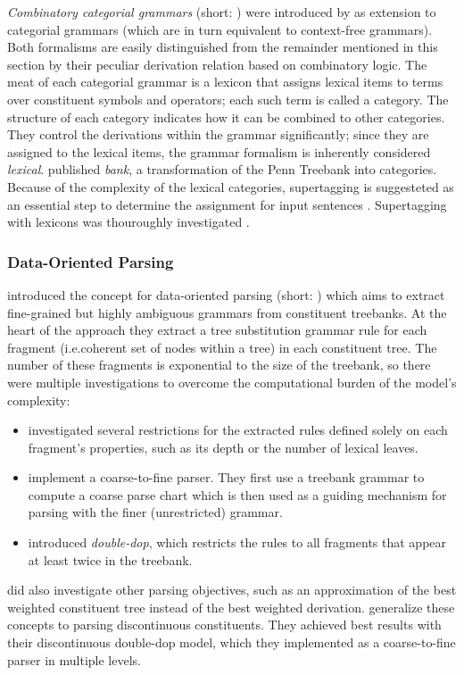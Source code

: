 \documentclass[../document.tex]{subfiles}
\begin{document}
    \emph{Combinatory categorial grammars} (short: ) were introduced by \citet{Ste11} as extension to categorial grammars (which are in turn equivalent to context-free grammars).
    Both formalisms are easily distinguished from the remainder mentioned in this section by their peculiar derivation relation based on combinatory logic.
    The meat of each categorial grammar is a lexicon that assigns lexical items to terms over constituent symbols and operators; each such term is called a category.
    The structure of each category indicates how it can be combined to other categories.
    They control the derivations within the grammar significantly; since they are assigned to the lexical items, the grammar formalism is inherently considered \emph{lexical}.
    \cite{Hoc07} published \emph{ bank}, a transformation of the Penn Treebank into  categories.
    Because of the complexity of the lexical categories, supertagging is suggesteted as an essential step to determine the assignment for input sentences \citep{Clark04}.
    Supertagging with  lexicons was thouroughly investigated \citep{clark2002supertagging, LewisSteedman14, vaswani2016supertagging, Kad18, StaSte20}.

    \subsubsection*{Data-Oriented Parsing}
    \citet{Bod92} introduced the concept for data-oriented parsing (short: ) which aims to extract fine-grained but highly ambiguous grammars from constituent treebanks.
    At the heart of the approach they extract a tree substitution grammar rule for each fragment (i.e.\@ coherent set of nodes within a tree) in each constituent tree.
    The number of these fragments is exponential to the size of the treebank, so there were multiple investigations to overcome the computational burden of the model's complexity:
    \begin{itemize}
        \item \citet{Bod01} investigated several restrictions for the extracted rules defined solely on each fragment's properties, such as its depth or the number of lexical leaves.
        \item \citet{Ban10} implement a coarse-to-fine parser. They first use a treebank grammar to compute a coarse parse chart which is then used as a guiding mechanism for parsing with the finer (unrestricted)  grammar.
        \item \citet{San11} introduced \emph{double-dop}, which restricts the rules to all fragments that appear at least twice in the treebank.
    \end{itemize}
    \citet{San11} did also investigate other parsing objectives, such as an approximation of the best weighted constituent tree instead of the best weighted derivation.
    \citet{Cra11,CraSchBod16} generalize these concepts to parsing discontinuous constituents.
    They achieved best results with their discontinuous double-dop model, which they implemented as a coarse-to-fine parser in multiple levels.
\end{document}
